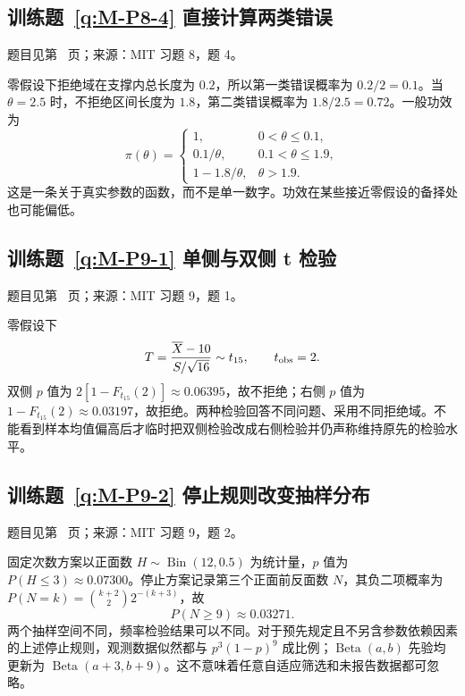 \subsection*{训练题~\ref{q:M-P8-4} 直接计算两类错误}\label{a:M-P8-4}{\small 题目见第~\pageref{q:M-P8-4} 页；来源：MIT 习题 8，题 4。}
\begin{solve}零假设下拒绝域在支撑内总长度为 $0.2$，所以第一类错误概率为 $0.2/2=0.1$。当 $\theta=2.5$ 时，不拒绝区间长度为 $1.8$，第二类错误概率为 $1.8/2.5=0.72$。一般功效为\[\pi(\theta)=\begin{cases}1,&0<\theta\le0.1,\\0.1/\theta,&0.1<\theta\le1.9,\\1-1.8/\theta,&\theta>1.9.\end{cases}\]这是一条关于真实参数的函数，而不是单一数字。功效在某些接近零假设的备择处也可能偏低。\end{solve}

\subsection*{训练题~\ref{q:M-P9-1} 单侧与双侧 t 检验}\label{a:M-P9-1}{\small 题目见第~\pageref{q:M-P9-1} 页；来源：MIT 习题 9，题 1。}
\begin{solve}零假设下\[T=\frac{\overline X-10}{S/\sqrt{16}}\sim t_{15},\qquad t_{\rm obs}=2.\]双侧 $p$ 值为 $2[1-F_{t_{15}}(2)]\approx0.06395$，故不拒绝；右侧 $p$ 值为 $1-F_{t_{15}}(2)\approx0.03197$，故拒绝。两种检验回答不同问题、采用不同拒绝域。不能看到样本均值偏高后才临时把双侧检验改成右侧检验并仍声称维持原先的检验水平。\end{solve}

\subsection*{训练题~\ref{q:M-P9-2} 停止规则改变抽样分布}\label{a:M-P9-2}{\small 题目见第~\pageref{q:M-P9-2} 页；来源：MIT 习题 9，题 2。}
\begin{solve}固定次数方案以正面数 $H\sim\operatorname{Bin}(12,0.5)$ 为统计量，$p$ 值为 $P(H\le3)\approx0.07300$。停止方案记录第三个正面前反面数 $N$，其负二项概率为 $P(N=k)=\binom{k+2}{2}2^{-(k+3)}$，故\[P(N\ge9)\approx0.03271.\]两个抽样空间不同，频率检验结果可以不同。对于预先规定且不另含参数依赖因素的上述停止规则，观测数据似然都与 $p^3(1-p)^9$ 成比例；$\operatorname{Beta}(a,b)$ 先验均更新为 $\operatorname{Beta}(a+3,b+9)$。这不意味着任意自适应筛选和未报告数据都可忽略。\end{solve}

